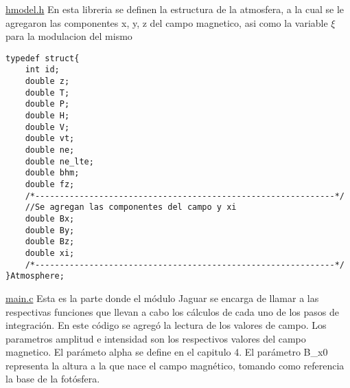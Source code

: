 \underline{hmodel.h}
En esta libreria se definen la estructura de la atmosfera, a la cual se le agregaron las componentes x, y, z del campo magnetico, asi como la variable $\xi$ para la modulacion del mismo
\begin{lstlisting}[style=CStyle]
typedef struct{
	int id;
	double z;
	double T;
	double P;
	double H;
	double V;
	double vt;
	double ne;
	double ne_lte;
	double bhm;
	double fz;
	/*-------------------------------------------------------------*/
	//Se agregan las componentes del campo y xi
	double Bx;
	double By;
	double Bz;
	double xi;
	/*-------------------------------------------------------------*/	
}Atmosphere;

\end{lstlisting}

\underline{main.c}
Esta es la parte donde el m\'odulo Jaguar se encarga de llamar a las respectivas funciones que llevan a cabo los c\'alculos de cada uno de los pasos de integraci\'on. En este c\'odigo se agreg\'o la lectura de los valores de campo.\newline
Los parametros amplitud e intensidad son los respectivos valores del campo magnetico.\newline
El par\'ameto alpha se define en el capitulo 4.\newline
El par\'ametro B\_x0 representa la altura a la que nace el campo magn\'etico, tomando como referencia la base de la fot\'osfera.
